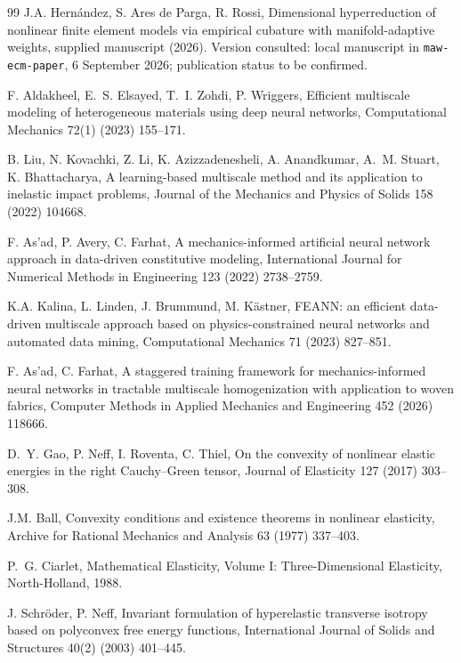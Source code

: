 \begin{thebibliography}{99}
J.A. Hern\'andez, S. Ares de Parga, R. Rossi, Dimensional hyperreduction of nonlinear finite element models via empirical cubature with manifold-adaptive weights, supplied manuscript (2026). Version consulted: local manuscript in \texttt{maw-ecm-paper}, 6 September 2026; publication status to be confirmed.

F. Aldakheel, E.~S. Elsayed, T.~I. Zohdi, P. Wriggers, Efficient
multiscale modeling of heterogeneous materials using deep neural
networks, Computational Mechanics 72(1) (2023) 155--171.

B. Liu, N. Kovachki, Z. Li, K. Azizzadenesheli, A. Anandkumar, A.~M.
Stuart, K. Bhattacharya, A learning-based multiscale method and its
application to inelastic impact problems, Journal of the
Mechanics and Physics of Solids 158 (2022) 104668.

F. As'ad, P. Avery, C. Farhat, A mechanics-informed artificial neural network approach in data-driven constitutive modeling, International Journal for Numerical Methods in Engineering 123 (2022) 2738--2759. 

K.A. Kalina, L. Linden, J. Brummund, M. K\"astner, FEANN: an efficient data-driven multiscale approach based on physics-constrained neural networks and automated data mining, Computational Mechanics 71 (2023) 827--851. 

F. As'ad, C. Farhat, A staggered training framework for
mechanics-informed neural networks in tractable multiscale
homogenization with application to woven fabrics, Computer
Methods in Applied Mechanics and Engineering 452 (2026) 118666.

D.~Y. Gao, P. Neff, I. Roventa, C. Thiel, On the convexity of
nonlinear elastic energies in the right Cauchy--Green tensor,
Journal of Elasticity 127 (2017) 303--308.

J.M. Ball, Convexity conditions and existence theorems in nonlinear elasticity, Archive for Rational Mechanics and Analysis 63 (1977) 337--403.

P.~G. Ciarlet, Mathematical Elasticity, Volume I: Three-Dimensional
Elasticity, North-Holland, 1988.

J. Schr\"oder, P. Neff, Invariant formulation of hyperelastic
transverse isotropy based on polyconvex free energy functions,
International Journal of Solids and Structures 40(2) (2003) 401--445.


\end{thebibliography}
